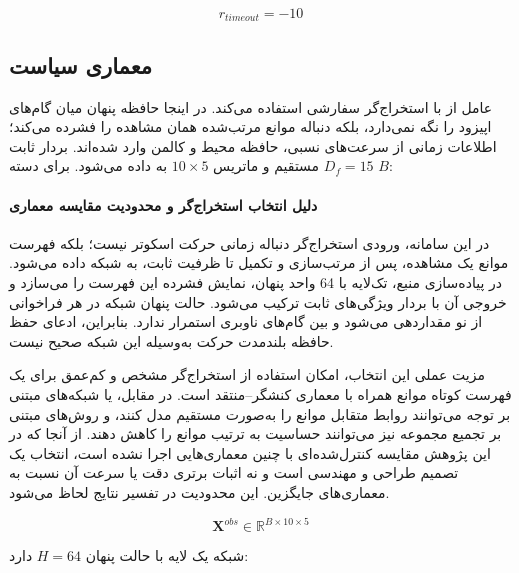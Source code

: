 \begin{equation}
	r_{timeout}=-10
	\label{eq:timeout_penalty_final}
\end{equation}

\subsection{معماری سیاست }
\label{subsec:lstm_sac_architecture_final}

عامل از  با استخراج‌گر سفارشی  استفاده می‌کند.  در اینجا حافظه پنهان میان گام‌های اپیزود را نگه نمی‌دارد، بلکه دنباله موانع مرتب‌شده همان مشاهده را فشرده می‌کند؛ اطلاعات زمانی از سرعت‌های نسبی، حافظه محیط و کالمن وارد شده‌اند. بردار ثابت \(D_f=15\) مستقیم و ماتریس \(10\times5\) به  داده می‌شود. برای دسته \(B\):

\paragraph{دلیل انتخاب استخراج‌گر  و محدودیت مقایسه معماری}
در این سامانه، ورودی استخراج‌گر  دنباله زمانی حرکت اسکوتر نیست؛ بلکه فهرست موانع یک مشاهده، پس از مرتب‌سازی و تکمیل تا ظرفیت ثابت، به شبکه داده می‌شود. در پیاده‌سازی منبع،  تک‌لایه با 64 واحد پنهان، نمایش فشرده این فهرست را می‌سازد و خروجی آن با بردار ویژگی‌های ثابت ترکیب می‌شود. حالت پنهان شبکه در هر فراخوانی از نو مقداردهی می‌شود و بین گام‌های ناوبری استمرار ندارد. بنابراین، ادعای حفظ حافظه بلندمدت حرکت به‌وسیله این شبکه صحیح نیست.

مزیت عملی این انتخاب، امکان استفاده از استخراج‌گر مشخص و کم‌عمق برای یک فهرست کوتاه موانع همراه با معماری کنشگر--منتقد  است. در مقابل،  یا شبکه‌های مبتنی بر توجه می‌توانند روابط متقابل موانع را به‌صورت مستقیم مدل کنند، و روش‌های مبتنی بر تجمیع مجموعه نیز می‌توانند حساسیت به ترتیب موانع را کاهش دهند. از آنجا که در این پژوهش مقایسه کنترل‌شده‌ای با چنین معماری‌هایی اجرا نشده است، انتخاب  یک تصمیم طراحی و مهندسی است و نه اثبات برتری دقت یا سرعت آن نسبت به معماری‌های جایگزین. این محدودیت در تفسیر نتایج لحاظ می‌شود.

\begin{equation}
	\mathbf{X}^{obs}\in\mathbb{R}^{B\times 10\times 5}
	\label{eq:lstm_input_shape_final}
\end{equation}

شبکه یک لایه با حالت پنهان \(H=64\) دارد:

